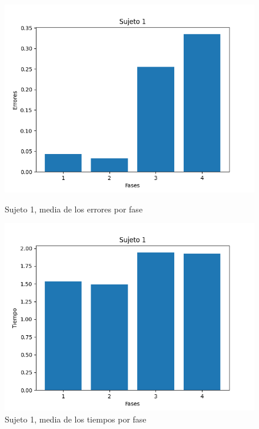 \documentclass[a4paper,11pt, oneside]{book}
\begin{document}
\begin{figure}[H]
	\begin{minipage}[b]{0.5\linewidth}
		\centering
		\includegraphics[width=\linewidth]{sujeto1-errores}
		\caption{Sujeto 1, media de los errores por fase}
		\label{sujeto1-errores}
	\end{minipage}
	\hspace{0.5cm}
	\begin{minipage}[b]{0.5\linewidth}
		\centering
		\includegraphics[width=\linewidth]{sujeto1-time}
		\caption{Sujeto 1, media de los tiempos por fase}
		\label{sujeto1-time}
	\end{minipage}
\end{figure}
\end{document}

